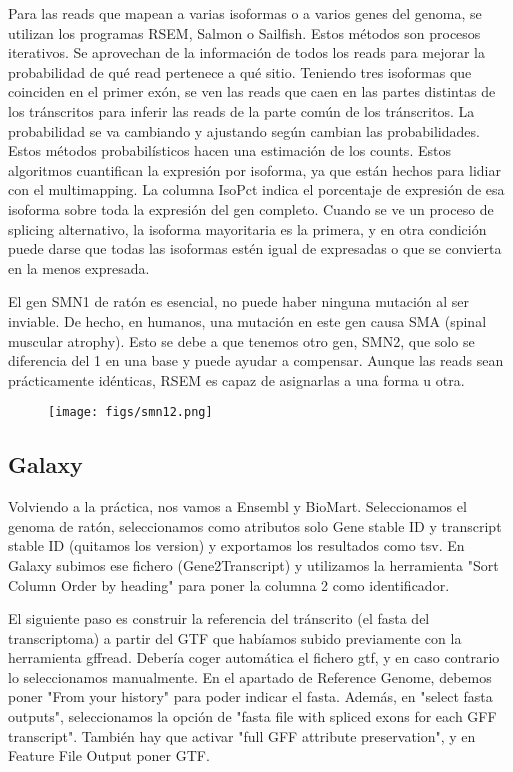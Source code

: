 Para las reads que mapean a varias isoformas o a varios genes del genoma, se utilizan los programas RSEM, Salmon o Sailfish. Estos métodos son procesos iterativos. Se aprovechan de la información de todos los reads para mejorar la probabilidad de qué read pertenece a qué sitio. Teniendo tres isoformas que coinciden en el primer exón, se ven las reads que caen en las partes distintas de los tránscritos para inferir las reads de la parte común de los tránscritos. La probabilidad se va cambiando y ajustando según cambian las probabilidades. Estos métodos probabilísticos hacen una estimación de los counts. Estos algoritmos cuantifican la expresión por isoforma, ya que están hechos para lidiar con el multimapping. La columna IsoPct indica el porcentaje de expresión de esa isoforma sobre toda la expresión del gen completo. Cuando se ve un proceso de splicing alternativo, la isoforma mayoritaria es la primera, y en otra condición puede darse que todas las isoformas estén igual de expresadas o que se convierta en la menos expresada.

El gen SMN1 de ratón es esencial, no puede haber ninguna mutación al ser inviable. De hecho, en humanos, una mutación en este gen causa SMA (spinal muscular atrophy). Esto se debe a que tenemos otro gen, SMN2, que solo se diferencia del 1 en una base y puede ayudar a compensar. Aunque las reads sean prácticamente idénticas, RSEM es capaz de asignarlas a una forma u otra.

\begin{figure}[h]
\centering
\texttt{[image: figs/smn12.png]}
\end{figure}

\subsection{Galaxy}
Volviendo a la práctica, nos vamos a Ensembl y BioMart. Seleccionamos el genoma de ratón, seleccionamos como atributos solo Gene stable ID y transcript stable ID (quitamos los version) y exportamos los resultados como tsv. En Galaxy subimos ese fichero (Gene2Transcript) y utilizamos la herramienta "Sort Column Order by heading" para poner la columna 2 como identificador. 

El siguiente paso es construir la referencia del tránscrito (el fasta del transcriptoma) a partir del GTF que habíamos subido previamente con la herramienta gffread. Debería coger automática el fichero gtf, y en caso contrario lo seleccionamos manualmente. En el apartado de Reference Genome, debemos poner "From your history" para poder indicar el fasta. Además, en "select fasta outputs", seleccionamos la opción de "fasta file with spliced exons for each GFF transcript". También hay que activar "full GFF attribute preservation", y en Feature File Output poner GTF.

